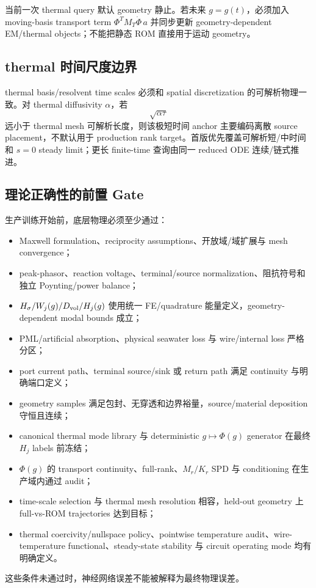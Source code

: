 当前一次 thermal query 默认 geometry 静止。若未来 $g=g(t)$，必须加入 moving-basis transport term $\Phi^TM_T\dot\Phi\,a$ 并同步更新 geometry-dependent EM/thermal objects；不能把静态 ROM 直接用于运动 geometry。

\subsection{thermal 时间尺度边界}
thermal basis/resolvent time scales 必须和 spatial discretization 的可解析物理一致。对 thermal diffusivity $\alpha$，若
\begin{equation}
\sqrt{\alpha\tau}
\end{equation}
远小于 thermal mesh 可解析长度，则该极短时间 anchor 主要编码离散 source placement，不默认用于 production rank target。首版优先覆盖可解析短/中时间和 $s=0$ steady limit；更长 finite-time 查询由同一 reduced ODE 连续/链式推进。

\subsection{理论正确性的前置 Gate}
生产训练开始前，底层物理必须至少通过：
\begin{itemize}
  \item Maxwell formulation、reciprocity assumptions、开放域/域扩展与 mesh convergence；
  \item peak-phasor、reaction voltage、terminal/source normalization、阻抗符号和独立 Poynting/power balance；
  \item $H_\sigma/W_j(g)/D_{\rm vol}/H_j(g)$ 使用统一 FE/quadrature 能量定义，geometry-dependent modal bounds 成立；
  \item PML/artificial absorption、physical seawater loss 与 wire/internal loss 严格分区；
  \item port current path、terminal source/sink 或 return path 满足 continuity 与明确端口定义；
  \item geometry samples 满足包封、无穿透和边界裕量，source/material deposition 守恒且连续；
  \item canonical thermal mode library 与 deterministic $g\mapsto\Phi(g)$ generator 在最终 $H_j$ labels 前冻结；
  \item $\Phi(g)$ 的 transport continuity、full-rank、$M_r/K_r$ SPD 与 conditioning 在生产域内通过 audit；
  \item time-scale selection 与 thermal mesh resolution 相容，held-out geometry 上 full-vs-ROM trajectories 达到目标；
  \item thermal coercivity/nullspace policy、pointwise temperature audit、wire-temperature functional、steady-state stability 与 circuit operating mode 均有明确定义。
\end{itemize}
这些条件未通过时，神经网络误差不能被解释为最终物理误差。

